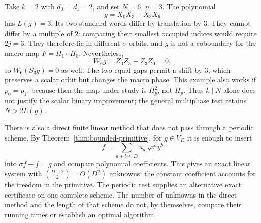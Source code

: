 \begin{example}\label{ex:phase-alias}
Take $k=2$ with $d_0=d_1=2$, and set $N=6$, $n=3$.  The polynomial
\[
 g=X_0X_3-X_3X_6
\]
has $L(g)=3$.  Its two standard words differ by translation by $3$.
They cannot differ by a multiple of $2$: comparing their smallest
occupied indices would require $2j=3$.  They therefore lie in
different $\sigma$-orbits, and $g$ is not a coboundary for the
macro map $F=H_1\circ H_0$.  Nevertheless,
\[
 W_6g=Z_0Z_3-Z_3Z_0=0,
\]
so $W_6(S_3g)=0$ as well.
The two equal gaps permit a shift by $3$, which preserves a scalar
orbit but changes the macro phase.  This example also works if
$p_0=p_1$, because then the map under study is $H_p^2$, not $H_p$.
Thus $k\mid N$ alone does not justify the scalar binary improvement;
the general multiphase test retains $N>2L(g)$.
\end{example}

There is also a direct finite linear method that does not pass through
a periodic scheme.  By Theorem~\ref{thm:bounded-primitive}, for
$g\in V_D$ it is enough to insert
\[
 f=\sum_{a+b\le D}u_{a,b}x^ay^b
\]
into $\sigma f-f=g$ and compare polynomial coefficients.  This
gives an exact linear system with $\binom{D+2}{2}=O(D^2)$ unknowns;
the constant coefficient accounts for the freedom in the primitive.
The periodic test supplies an alternative exact certificate on one
complete scheme.  The number of unknowns in the direct method and
the length of that scheme do not, by themselves, compare their
running times or establish an optimal algorithm.
